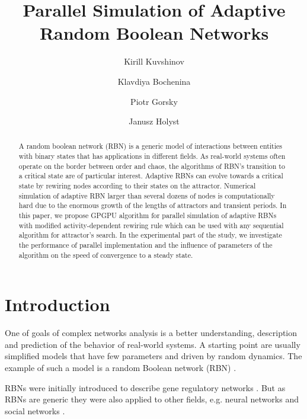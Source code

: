 \documentclass[procedia]{easychair}
\title{Parallel Simulation of Adaptive Random Boolean Networks}
\author{
	Kirill Kuvshinov\inst{1}
	\and
	Klavdiya Bochenina\inst{1}
	\and
	Piotr Gorsky\inst{2}
	\and
	Janusz Holyst\inst{1}\inst{2}
}
\institute{
	ITMO University, St. Petersburg, Russian Federation
	\and
	Warsaw University of Technology, Warsaw, Poland
}
\begin{document}
	
	\maketitle
	
	
	\begin{abstract}
		A random boolean network (RBN) is a generic model of interactions between entities with binary states that has applications in different fields. As real-world systems often operate on the border between order and chaos, the algorithms of RBN's transition to a critical state are of particular interest. Adaptive RBNs can evolve towards a critical state by rewiring nodes according to their states on the attractor. Numerical simulation of adaptive RBN larger than several dozens of nodes is computationally hard due to the enormous growth of the lengths of attractors and transient periods. In this paper, we propose GPGPU algorithm for parallel simulation of adaptive RBNs with modified activity-dependent rewiring rule which can be used with any sequential algorithm for attractor's search. In the experimental part of the study, we investigate the performance of parallel implementation and the influence of parameters of the algorithm on the speed of convergence to a steady state. 
	\end{abstract}
	
	
	\section{Introduction}
	\label{sect:introduction}
	
	One of goals of complex networks analysis is a better understanding, description and prediction of the behavior of real-world systems. A starting point are usually simplified models that have few parameters and driven by random dynamics. The example of such a model is a random Boolean network (RBN) \cite{gershenson04,drossel2008random,cheng2011random,aldana2003boolean}. 
	
	RBNs were initially introduced to describe gene regulatory networks \cite{kauffman1969metabolic,kauffman2004ensemble}. But as RBNs are generic they were also applied to other fields, e.g. neural networks and social networks \cite{drossel2008random}.
	
\end{document}
